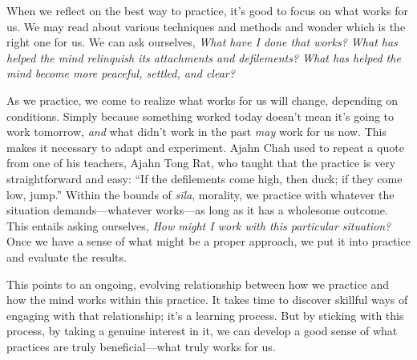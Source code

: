 
When we reflect on the best way to practice, it's good to focus on what 
works for us. We may read about various techniques and methods and 
wonder which is the right one for us. We can ask ourselves, \emph{What 
have I done that works? What has helped the mind relinquish its 
attachments and defilements? What has helped the mind become more 
peaceful, settled, and clear?}

As we practice, we come to realize what works for us will change, 
depending on conditions. Simply because something worked today doesn't 
mean it's going to work tomorrow, \emph{and} what didn't work in the 
past \emph{may} work for us now. This makes it necessary to adapt and 
experiment. Ajahn Chah used to repeat a quote from one of his teachers, 
Ajahn Tong Rat, who taught that the practice is very straightforward 
and easy: ``If the defilements come high, then duck; if they come low, 
jump.'' Within the bounds of \emph{sīla}, morality, we practice with 
whatever the situation demands---whatever works---as long as it has a 
wholesome outcome. This entails asking ourselves, \emph{How might I 
work with this particular situation?} Once we have a sense of what 
might be a proper approach, we put it into practice and evaluate the 
results.

This points to an ongoing, evolving relationship between how we 
practice and how the mind works within this practice. It takes time to 
discover skillful ways of engaging with that relationship; it's a 
learning process. But by sticking with this process, by taking a 
genuine interest in it, we can develop a good sense of what practices 
are truly beneficial---what truly works for us.

